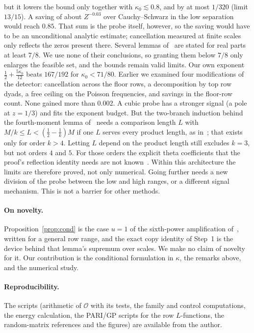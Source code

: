 \documentclass[11pt]{article}
\theoremstyle{remark}
\begin{document}
but it lowers the bound only together with $\kappa_0\lesssim0.8$, and by at most $1/320$ (limit
$13/15$). A saving of about $Z^{-0.03}$ over Cauchy--Schwarz in the low separation would
reach $0.85$. That sum is the probe itself, however, so the saving would have to be an unconditional
analytic estimate; cancellation measured at finite scales only reflects the zeros present there. Several lemmas of~\cite{OAI78} are stated for real parts at least
$7/8$. We use none of their conclusions, so granting them below $7/8$ only enlarges the feasible
set, and the bounds remain valid limits. Our own exponent $\frac12+\frac{5\kappa_0}{12}$ beats
$167/192$ for $\kappa_0<71/80$. Earlier we examined four modifications of the detector:
cancellation across the floor rows, a decomposition by top row dyads, a free ceiling on the
Poisson frequencies, and savings in the floor-row count. None gained more than $0.002$. A cubic
probe has a stronger signal (a pole at $z=1/3$) and fits the exponent budget. But the two-branch
induction behind the fourth-moment lemma of~\cite{OAI78} needs a comparison length $L$ with
$M/k\le L<(\frac12-\frac1k)M$ if one $L$ serves every product length, as in~\cite{OAI78}; that
exists only for order $k>4$. Letting $L$ depend on the product length still excludes $k=3$, but not
orders $4$ and $5$. For those orders the explicit theta coefficients that the proof's reflection
identity needs are not known~\cite{N78}. Within this architecture the limits are therefore
proved, not only numerical. Going further needs a new division of the probe between the low and
high ranges, or a different signal mechanism. This is not a barrier for other methods.

\paragraph{On novelty.} Proposition~\ref{prop:cond} is the case $u=1$ of the sixth-power amplification
of~\cite[Lemma~17.6]{OAI78}, written for a general row range, and the exact copy identity of
Step~1 is the device behind that lemma's supremum over scales. We make no claim of novelty for
it. Our contribution is the conditional formulation in $\kappa$, the remarks above, and the
numerical study.

\paragraph{Reproducibility.} The scripts (arithmetic of $\mathcal O$ with its tests, the
family and control computations, the energy calculation, the PARI/GP scripts for the row
$L$-functions, the random-matrix references and the figures) are available from the author.
\end{document}
